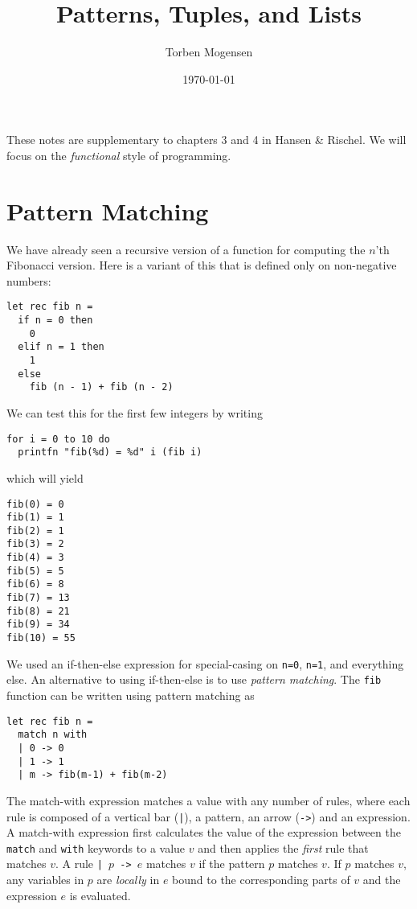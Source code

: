 \documentclass[a4paper]{article}
\begin{document}
\title{Patterns, Tuples, and Lists}

\author{Torben Mogensen}
\date{\today}

\maketitle

\noindent
These notes are supplementary to chapters 3 and 4 in Hansen \&
Rischel.  We will focus on the \emph{functional} style of programming.

\section{Pattern Matching}

We have already seen a recursive version of a function for computing
the $n$'th Fibonacci version.  Here is a variant of this that is
defined only on non-negative numbers:

\begin{verbatim}
let rec fib n =
  if n = 0 then
    0
  elif n = 1 then
    1
  else
    fib (n - 1) + fib (n - 2)
\end{verbatim}

\noindent
We can test this for the first few integers by writing


\begin{verbatim}
for i = 0 to 10 do
  printfn "fib(%d) = %d" i (fib i)
\end{verbatim}

\noindent
which will yield

\begin{verbatim}
fib(0) = 0
fib(1) = 1
fib(2) = 1
fib(3) = 2
fib(4) = 3
fib(5) = 5
fib(6) = 8
fib(7) = 13
fib(8) = 21
fib(9) = 34
fib(10) = 55
\end{verbatim}

\noindent
We used an if-then-else expression for special-casing on \texttt{n=0},
\texttt{n=1}, and everything else.  An alternative to using
if-then-else is to use \emph{pattern matching}.  The \texttt{fib}
function can be written using pattern matching as

\begin{verbatim}
let rec fib n =
  match n with
  | 0 -> 0
  | 1 -> 1
  | m -> fib(m-1) + fib(m-2)
\end{verbatim}

\noindent
The match-with expression matches a value with any number of rules,
where each rule is composed of a vertical bar (\texttt{|}), a pattern,
an arrow (\texttt{->}) and an expression.  A match-with
expression first calculates the value of the expression between the
\texttt{match} and \texttt{with} keywords to a value $v$ and then
applies the \emph{first} rule that matches $v$.  A rule
\texttt{|~$p$~->~$e$} matches $v$ if the pattern $p$ matches $v$.  If
$p$ matches $v$, any variables in $p$ are \emph{locally} in $e$ bound
to the corresponding parts of $v$ and the expression $e$ is evaluated.
\end{document}
